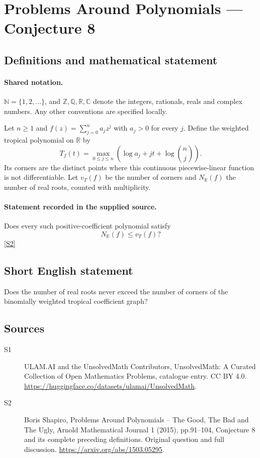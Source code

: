 \documentclass[11pt]{article}
\newcommand{\sref}[2]{\hyperlink{source:#1:#2}{[S#2]}}
\begin{document}
\section{Problems Around Polynomials — Conjecture 8}\label{statement}

\subsection{Definitions and mathematical statement}

\paragraph{Shared notation.}$\mathbb N=\{1,2,\ldots\}$, and $\mathbb Z,\mathbb Q,\mathbb R,\mathbb C$ denote the integers, rationals, reals and complex numbers. Any other conventions are specified locally.


Let $n\geq1$ and $f(z)=\sum_{j=0}^n a_jz^j$ with $a_j>0$ for every $j$. Define the weighted tropical polynomial on $\mathbb R$ by
\[T_f(t)=\max_{0\leq j\leq n}\left(\log a_j+jt+\log\binom nj\right).\]
Its corners are the distinct points where this continuous piecewise-linear function is not differentiable. Let $v_T(f)$ be the number of corners and $N_{\mathbb R}(f)$ the number of real roots, counted with multiplicity.
\paragraph{Statement recorded in the supplied source.}
Does every such positive-coefficient polynomial satisfy
\[N_{\mathbb R}(f)\leq v_T(f)?\] \sref{statement}{2}
\subsection{Short English statement}
Does the number of real roots never exceed the number of corners of the binomially weighted tropical coefficient graph?
\subsection{Sources}
\begin{description}
\item[\hypertarget{source:statement:1}{S1}] ULAM.AI and the UnsolvedMath Contributors, UnsolvedMath: A Curated Collection of Open Mathematics Problems, catalogue entry. CC BY 4.0. \url{https://huggingface.co/datasets/ulamai/UnsolvedMath}.
\item[\hypertarget{source:statement:2}{S2}] Boris Shapiro, Problems Around Polynomials -- The Good, The Bad and The Ugly, Arnold Mathematical Journal 1 (2015), pp.91--104, Conjecture 8 and its complete preceding definitions. Original question and full discussion. \url{https://arxiv.org/abs/1503.05295}.

\end{description}
\label{end:statement}
\end{document}

